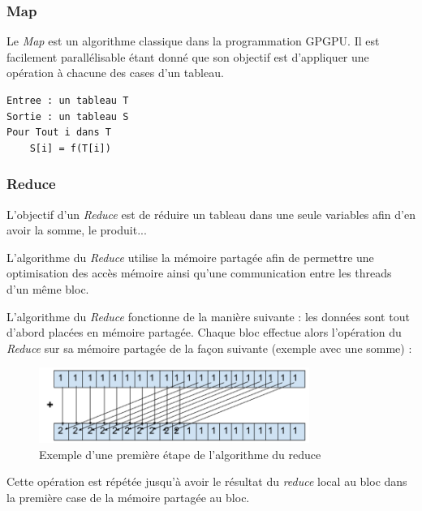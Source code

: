 \documentclass{report}
\begin{document}
\subsubsection{Map}

Le \textit{Map} est un algorithme classique dans la programmation GPGPU. Il est facilement parallélisable étant donné que son objectif est d'appliquer une opération à chacune des cases d'un tableau.\newline

\begin{lstlisting} 
Entree : un tableau T
Sortie : un tableau S
Pour Tout i dans T
    S[i] = f(T[i])
\end{lstlisting}

\subsubsection{Reduce}

L'objectif d'un \textit{Reduce} est de réduire un tableau dans une seule variables afin d'en avoir la somme, le produit...\newline

L'algorithme du \textit{Reduce} utilise la mémoire partagée afin de permettre une optimisation des accès mémoire ainsi qu'une communication entre les threads d'un même bloc.\newline

L'algorithme du \textit{Reduce} fonctionne de la manière suivante : les données sont tout d'abord placées en mémoire partagée. Chaque bloc effectue alors l'opération du \textit{Reduce} sur sa mémoire partagée de la façon suivante (exemple avec une somme) : \newline
\begin{center}
\end{center}
\begin{figure}[!h]
\begin{center}
\includegraphics[width=250pt]{images_finales/schema_reduce.png}
\end{center}
\caption{Exemple d'une première étape de l'algorithme du reduce}
\label{test9}
\end{figure}

Cette opération est répétée jusqu'à avoir le résultat du \textit{reduce} local au bloc dans la première case de la mémoire partagée au bloc.\newline
\end{document}
